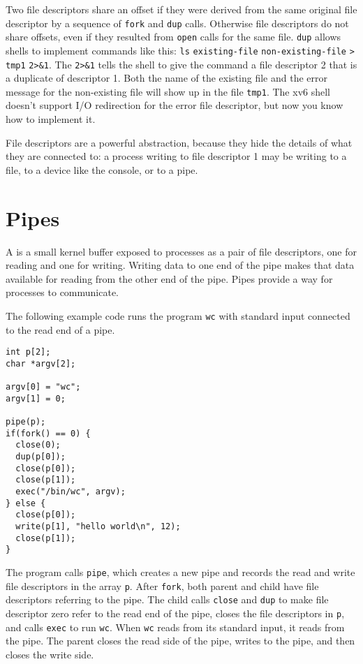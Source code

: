 Two file descriptors share an offset if they were derived from
the same original file descriptor by a sequence of
\lstinline{fork}
and
\lstinline{dup}
calls.
Otherwise file descriptors do not share offsets, even if they
resulted from
\lstinline{open}
calls for the same file.
\lstinline{dup}
allows shells to implement commands like this:
\lstinline{ls}
\lstinline{existing-file}
\lstinline{non-existing-file}
\lstinline{>}
\lstinline{tmp1}
\lstinline{2>&1}.
The
\lstinline{2>&1}
tells the shell to give the command a file descriptor 2 that
is a duplicate of descriptor 1.
Both the name of the existing file and the error message for the
non-existing file will show up in the file
\lstinline{tmp1}.
The xv6 shell doesn't support I/O redirection for the error file
descriptor, but now you know how to implement it.

File descriptors are a powerful abstraction,
because they hide the details of what they are connected to:
a process writing to file descriptor 1 may be writing to a
file, to a device like the console, or to a pipe.
\section{Pipes}

A
is a small kernel buffer exposed to processes as a pair of
file descriptors, one for reading and one for writing.
Writing data to one end of the pipe
makes that data available for reading from the other end of the pipe.
Pipes provide a way for processes to communicate.

The following example code runs the program
\lstinline{wc}
with standard input connected to
the read end of a pipe.
\begin{lstlisting}[]
int p[2];
char *argv[2];

argv[0] = "wc";
argv[1] = 0;

pipe(p);
if(fork() == 0) {
  close(0);
  dup(p[0]);
  close(p[0]);
  close(p[1]);
  exec("/bin/wc", argv);
} else {
  close(p[0]);
  write(p[1], "hello world\n", 12);
  close(p[1]);
}
\end{lstlisting}
The program calls
\lstinline{pipe},
which creates a new pipe and records the read and write
file descriptors in the array
\lstinline{p}.
After
\lstinline{fork},
both parent and child have file descriptors referring to the pipe.
The child calls \lstinline{close} and \lstinline{dup} to make file descriptor
zero refer to the read end of the pipe,
closes the file descriptors in
\lstinline{p},
and calls \lstinline{exec} to run
\lstinline{wc}.
When
\lstinline{wc}
reads from its standard input, it reads from the pipe.
The parent closes the read side of the pipe,
writes to the pipe,
and then closes the write side.

